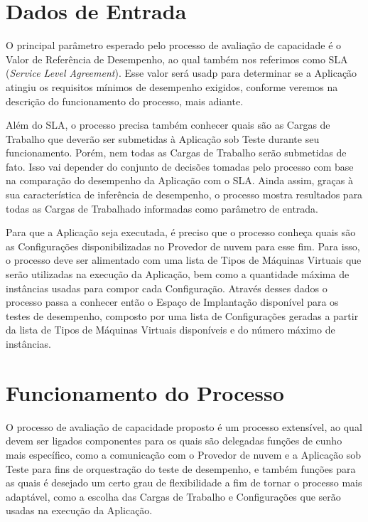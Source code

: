 \section{Dados de Entrada}

O principal parâmetro esperado pelo processo de avaliação de capacidade é o Valor
de Referência de Desempenho, ao qual também nos referimos como SLA 
(\emph{Service Level Agreement}). Esse valor será usadp para determinar 
se a Aplicação atingiu os requisitos mínimos de desempenho exigidos, conforme
veremos na descrição do funcionamento do processo, mais adiante.

Além do SLA, o processo precisa também conhecer quais são as Cargas de Trabalho
que deverão ser submetidas à Aplicação sob Teste durante seu funcionamento. Porém,
nem todas as Cargas de Trabalho serão submetidas de fato. Isso vai depender do 
conjunto de decisões tomadas pelo processo com base na comparação do desempenho 
da Aplicação com o SLA. Ainda assim, graças à sua característica de inferência de
desempenho, o processo mostra resultados para todas as Cargas de Trabalhado 
informadas como parâmetro de entrada.

Para que a Aplicação seja executada, é preciso que o processo conheça quais são
as Configurações disponibilizadas no Provedor de nuvem para esse fim. Para isso,
o processo deve ser alimentado com uma lista de Tipos de Máquinas Virtuais que
serão utilizadas na execução da Aplicação, bem como a quantidade máxima de 
instâncias usadas para compor cada Configuração. Através desses dados o processo
passa a conhecer então o Espaço de Implantação disponível para os testes de 
desempenho, composto por uma lista de Configurações geradas a partir da lista de
Tipos de Máquinas Virtuais disponíveis e do número máximo de instâncias.

\section{Funcionamento do Processo}

O processo de avaliação de capacidade proposto é um processo extensível, ao qual
devem ser ligados componentes para os quais são delegadas funções de cunho mais
específico, como a comunicação com o Provedor de nuvem e a Aplicação sob Teste
para fins de orquestração do teste de desempenho, e também funções para as quais
é desejado um certo grau de flexibilidade a fim de tornar o processo mais adaptável,
como a escolha das Cargas de Trabalho e Configurações que serão usadas na execução
da Aplicação.

